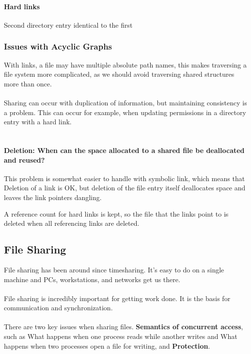 \documentclass{article}
\begin{document}
\paragraph{Hard links} Second directory entry identical to the first

\subsubsection{Issues with Acyclic Graphs}

With links, a file may have multiple absolute path names, this makes traversing a file system more complicated, as we should avoid traversing shared structures more than once.
\\
\\
Sharing can occur with duplication of information, but maintaining consistency is a problem. This can occur for example, when updating permissions in a directory entry with a hard link.
\\
\\
\paragraph{Deletion: When can the space allocated to a shared file be deallocated and reused?} This problem is somewhat easier to handle with symbolic link, which means that Deletion of a link is OK, but deletion of the file entry itself deallocates space and leaves the link pointers dangling.

A reference count for hard links is kept, so the file that the links point to is deleted when all referencing links are deleted.

\subsection{File Sharing}

File sharing has been around since timesharing. It's easy to do on a single machine and PCs, workstations, and networks get us there.
\\
\\
File sharing is incredibly important for getting work done. It is the basis for communication and synchronization.
\\
\\
There are two key issues when sharing files. \textbf{Semantics of concurrent access}, such as What happens when one process reads while another writes and What happens when two processes open a file for writing, and \textbf{Protection}.
\end{document}
